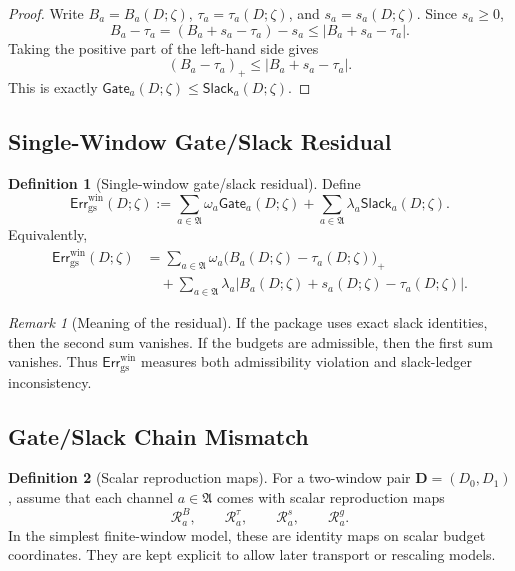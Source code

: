 \documentclass[11pt]{article}
\numberwithin{equation}{section}
\theoremstyle{definition}
\newtheorem{definition}[definition]{Definition}
\theoremstyle{remark}
\newtheorem{remark}[remark]{Remark}
\newcommand{\gs}{\mathrm{gs}}
\newcommand{\Err}{\mathsf{Err}}
\newcommand{\Gate}{\mathsf{Gate}}
\newcommand{\Slack}{\mathsf{Slack}}
\newcommand{\calR}{\mathcal R}
\newcommand{\bD}{\mathbf D}
\newcommand{\Achan}{\mathfrak A}
\begin{document}
\begin{proof}
Write \(B_a=B_a(D;\zeta)\), \(\tau_a=\tau_a(D;\zeta)\), and
\(s_a=s_a(D;\zeta)\).  Since \(s_a\ge0\),
\[
    B_a-\tau_a
    =
    (B_a+s_a-\tau_a)-s_a
    \le
    |B_a+s_a-\tau_a|.
\]
Taking the positive part of the left-hand side gives
\[
    (B_a-\tau_a)_+
    \le
    |B_a+s_a-\tau_a|.
\]
This is exactly \(\Gate_a(D;\zeta)\le\Slack_a(D;\zeta)\).
\end{proof}

\subsection{Single-Window Gate/Slack Residual}
\label{gs:sec:single-window-residual}

\begin{definition}[Single-window gate/slack residual]
\label{gs:def:single-window-gs-residual}
Define
\[
    \Err_{\gs}^{\mathrm{win}}(D;\zeta)
    :=
    \sum_{a\in\Achan}\omega_a\Gate_a(D;\zeta)
    +
    \sum_{a\in\Achan}\lambda_a\Slack_a(D;\zeta).
\]
Equivalently,
\[
\begin{aligned}
    \Err_{\gs}^{\mathrm{win}}(D;\zeta)
    &=
    \sum_{a\in\Achan}
    \omega_a
    \bigl(B_a(D;\zeta)-\tau_a(D;\zeta)\bigr)_+
\\
    &\quad+
    \sum_{a\in\Achan}
    \lambda_a
    |B_a(D;\zeta)+s_a(D;\zeta)-\tau_a(D;\zeta)|.
\end{aligned}
\]
\end{definition}

\begin{remark}[Meaning of the residual]
If the package uses exact slack identities, then the second sum vanishes.  If
the budgets are admissible, then the first sum vanishes.  Thus
\(\Err_{\gs}^{\mathrm{win}}\) measures both admissibility violation and
slack-ledger inconsistency.
\end{remark}

\subsection{Gate/Slack Chain Mismatch}
\label{gs:sec:chain-mismatch}

\begin{definition}[Scalar reproduction maps]
\label{gs:def:scalar-reproduction-maps}
For a two-window pair \(\bD=(D_0,D_1)\), assume that each channel \(a\in\Achan\)
comes with scalar reproduction maps
\[
    \calR_a^B,\qquad
    \calR_a^\tau,\qquad
    \calR_a^s,\qquad
    \calR_a^g.
\]
In the simplest finite-window model, these are identity maps on scalar budget
coordinates.  They are kept explicit to allow later transport or rescaling
models.
\end{definition}
\end{document}
